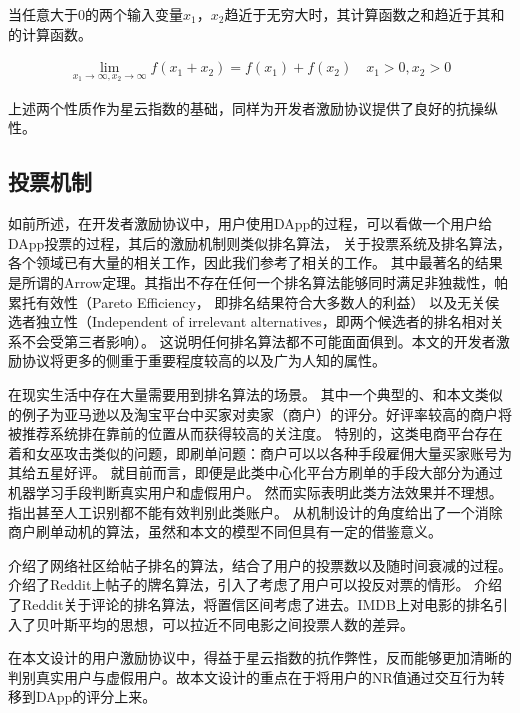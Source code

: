 \begin{property}
\label{prop:two}
当任意大于$0$的两个输入变量$x_1$，$x_2$趋近于无穷大时，其计算函数之和趋近于其和的计算函数。
\end{property}
\begin{align}
\lim\limits_{x_1 \to \infty, x_2\to \infty} f(x_1+x_2) = f(x_1) + f(x_2)\quad x_1>0, x_2>0
\end{align}

\noindent 上述两个性质作为星云指数的基础，同样为开发者激励协议提供了良好的抗操纵性。

\subsection{投票机制}
如前所述，在开发者激励协议中，用户使用DApp的过程，可以看做一个用户给DApp投票的过程，其后的激励机制则类似排名算法，
关于投票系统及排名算法，各个领域已有大量的相关工作，因此我们参考了相关的工作。
其中最著名的结果是所谓的Arrow定理\cite{arrow1951extension}。其指出不存在任何一个排名算法能够同时满足非独裁性，帕累托有效性（Pareto Efficiency， 即排名结果符合大多数人的利益）
以及无关侯选者独立性（Independent of irrelevant alternatives，即两个候选者的排名相对关系不会受第三者影响）。
这说明任何排名算法都不可能面面俱到。本文的开发者激励协议将更多的侧重于重要程度较高的以及广为人知的属性。

在现实生活中存在大量需要用到排名算法的场景。
其中一个典型的、和本文类似的例子为亚马逊以及淘宝平台中买家对卖家（商户）的评分。好评率较高的商户将被推荐系统排在靠前的位置从而获得较高的关注度。
特别的，这类电商平台存在着和女巫攻击类似的问题，即刷单问题：商户可以以各种手段雇佣大量买家账号为其给五星好评。
就目前而言，即便是此类中心化平台方刷单的手段大部分为通过机器学习手段判断真实用户和虚假用户\cite{mukherjee2013spotting,jindal2008opinion,yoo2009comparison}。
然而实际表明此类方法效果并不理想。\cite{ott2011finding}指出甚至人工识别都不能有效判别此类账户。
\cite{cai2016mechanism}从机制设计的角度给出了一个消除商户刷单动机的算法，虽然和本文的模型不同但具有一定的借鉴意义。


\cite{salihefendic2010hacker}介绍了网络社区给帖子排名的算法，结合了用户的投票数以及随时间衰减的过程。
\cite{salihefendic2010reddit}介绍了Reddit上帖子的牌名算法，引入了考虑了用户可以投反对票的情形。
\cite{miller2009how}介绍了Reddit关于评论的排名算法，将置信区间考虑了进去。IMDB\cite{IMDB}上对电影的排名引入了贝叶斯平均的思想，可以拉近不同电影之间投票人数的差异。

在本文设计的用户激励协议中，得益于星云指数的抗作弊性，反而能够更加清晰的判别真实用户与虚假用户。故本文设计的重点在于将用户的NR值通过交互行为转移到DApp的评分上来。




